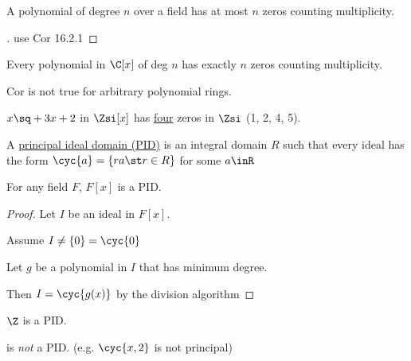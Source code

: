 \documentclass[a4paper]{article}
\begin{document}
\begin{corollary}
  A polynomial of degree \( n \) over a field has at most \( n \) zeros counting multiplicity.
\end{corollary}

\begin{proof}[]
  use Cor 16.2.1
\end{proof}

\begin{example}
  Every polynomial in \( \C[x] \) of deg \( n \) has exactly \( n \) zeros counting multiplicity.
\end{example}

Cor is not true for arbitrary polynomial rings.

\begin{example}
  \( x\sq+3x+2 \) in \( \Zsi[x] \) has \ul{four} zeros in \( \Zsi \) (1, 2, 4, 5).
\end{example}

\begin{definition}
  A \ul{principal ideal domain (PID)} is an integral domain \( R \) such that every ideal has the form \( \cyc{a}=\{ra\st r\in R\} \) for some \( a\inR \)
\end{definition}

\begin{theorem}
  For any field \( F \), \( F[x] \) is a PID.
\end{theorem}

\begin{proof}
  Let \( I \) be an ideal in \( F[x] \).

  Assume \( I\neq \{0\}=\cyc{0} \)

  Let \( g \) be a polynomial in \( I \) that has minimum degree.

  Then \( I=\cyc{g(x)} \) by the division algorithm
\end{proof}

\begin{theorem}
  \( \Z \) is a PID.
\end{theorem}

\begin{example}
  \Z[x] is \emph{not} a PID. (e.g. \( \cyc{x,2} \) is not principal)
\end{example}
\end{document}
